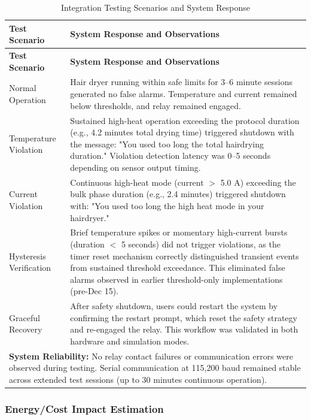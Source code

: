 \documentclass[11pt,a4paper]{article}
\begin{document}
\begin{longtable}{|p{}|p{}|}
\caption{Integration Testing Scenarios and System Response}
\label{tab:control_test_scenarios} \\
\hline
\textbf{Test Scenario} & \textbf{System Response and Observations} \\
\hline
\endfirsthead
\hline
\textbf{Test Scenario} & \textbf{System Response and Observations} \\
\hline
\endhead
\hline
\endfoot
\hline
\endlastfoot
Normal Operation & Hair dryer running within safe limits for 3--6 minute sessions generated no false alarms. Temperature and current remained below thresholds, and relay remained engaged. \\
\hline
Temperature Violation & Sustained high-heat operation exceeding the protocol duration (e.g., 4.2 minutes total drying time) triggered shutdown with the message: "You used too long the total hairdrying duration." Violation detection latency was 0--5 seconds depending on sensor output timing. \\
\hline
Current Violation & Continuous high-heat mode (current $>$ 5.0 A) exceeding the bulk phase duration (e.g., 2.4 minutes) triggered shutdown with: "You used too long the high heat mode in your hairdryer." \\
\hline
Hysteresis Verification & Brief temperature spikes or momentary high-current bursts (duration $<$ 5 seconds) did not trigger violations, as the timer reset mechanism correctly distinguished transient events from sustained threshold exceedance. This eliminated false alarms observed in earlier threshold-only implementations (pre-Dec 15). \\
\hline
Graceful Recovery & After safety shutdown, users could restart the system by confirming the restart prompt, which reset the safety strategy and re-engaged the relay. This workflow was validated in both hardware and simulation modes. \\
\hline
\multicolumn{2}{|p{0.94\textwidth}|}{\textbf{System Reliability:} No relay contact failures or communication errors were observed during testing. Serial communication at 115,200 baud remained stable across extended test sessions (up to 30 minutes continuous operation).} \\
\hline
\end{longtable}

\subsubsection*{Energy/Cost Impact Estimation}
\end{document}
